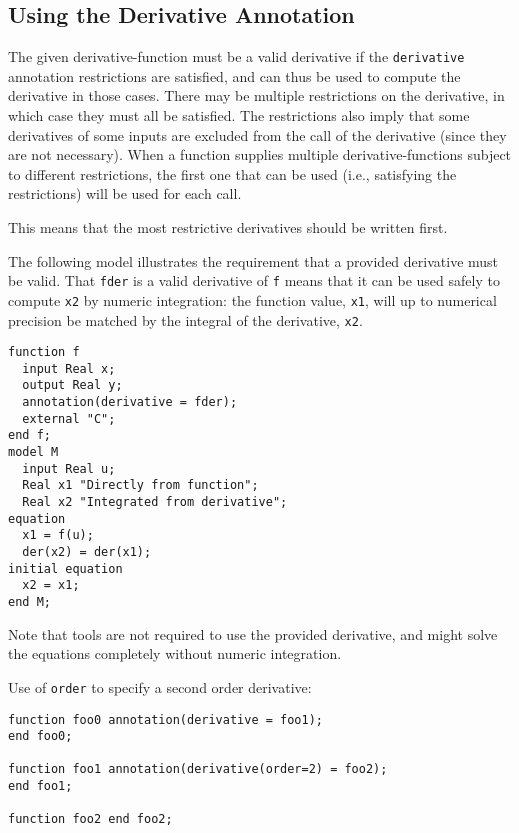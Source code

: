 \subsection{Using the Derivative Annotation}\label{using-the-derivative-annotation}

The given derivative-function must be a valid derivative if the {\lstinline!derivative!} annotation restrictions are satisfied, and can thus be used to compute the derivative in those cases.
There may be multiple restrictions on the derivative, in which case they must all be satisfied.
The restrictions also imply that some derivatives of some inputs are excluded from the call of the derivative (since they are not necessary).
When a function supplies multiple derivative-functions subject to different restrictions, the first one that can be used (i.e., satisfying the restrictions) will be used for each call.

\begin{nonnormative}
This means that the most restrictive derivatives should be written first.
\end{nonnormative}

\begin{example}
The following model illustrates the requirement that a provided derivative must be valid.
That {\lstinline!fder!} is a valid derivative of {\lstinline!f!} means that it can be used safely to compute {\lstinline!x2!} by numeric integration: the function value, {\lstinline!x1!}, will up to numerical precision be matched by the integral of the derivative, {\lstinline!x2!}.
\begin{lstlisting}[language=modelica]
function f
  input Real x;
  output Real y;
  annotation(derivative = fder);
  external "C";
end f;
model M
  input Real u;
  Real x1 "Directly from function";
  Real x2 "Integrated from derivative";
equation
  x1 = f(u);
  der(x2) = der(x1);
initial equation
  x2 = x1;
end M;
\end{lstlisting}
Note that tools are not required to use the provided derivative, and might solve the equations completely without numeric integration.
\end{example}

\begin{example}
Use of {\lstinline!order!} to specify a second order derivative:
\begin{lstlisting}[language=modelica]
function foo0 annotation(derivative = foo1);
end foo0;

function foo1 annotation(derivative(order=2) = foo2);
end foo1;

function foo2 end foo2;
\end{lstlisting}
\end{example}


